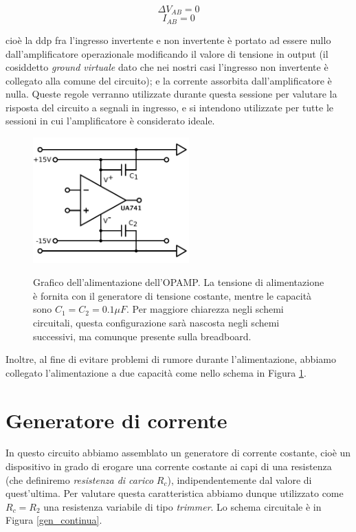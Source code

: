 \begin{equation}
\Delta V_{AB}=0
\label{eq:regola_V}
\end{equation}
\begin{equation}
I_{AB}=0
\label{eq:regola_I}
\end{equation}

cioè la ddp fra l'ingresso invertente e non invertente è portato ad essere nullo dall'amplificatore operazionale modificando il valore di tensione in output (il cosiddetto \textit{ground virtuale} dato che nei nostri casi l'ingresso non invertente è collegato alla comune del circuito); e la corrente assorbita dall'amplificatore è nulla.
Queste regole verranno utilizzate durante questa sessione per valutare la risposta del circuito a segnali in ingresso, e si intendono utilizzate per tutte le sessioni in cui l'amplificatore è considerato ideale.

\begin{figure}[ht]
 \centering
   {\includegraphics[width=6cm]{../E01/latex/alimentazione.pdf}}
 \caption{Grafico dell'alimentazione dell'OPAMP. La tensione di alimentazione è fornita con il generatore di tensione costante, mentre le capacità sono $C_1=C_2=0.1 \mu F$. Per maggiore chiarezza negli schemi circuitali, questa configurazione sarà nascosta negli schemi successivi, ma comunque presente sulla breadboard.}
 \label{gr:costante}
\end{figure}

Inoltre, al fine di evitare problemi di rumore durante l'alimentazione, abbiamo collegato l'alimentazione a due capacità come nello schema in Figura \ref{gr:costante}.

\section{Generatore di corrente}

In questo circuito abbiamo assemblato un generatore di corrente costante, cioè un dispositivo in grado di erogare una corrente costante ai capi di una resistenza (che definiremo \textit{resistenza di carico} $R_c$), indipendentemente dal valore di quest'ultima. Per valutare questa caratteristica abbiamo dunque utilizzato come $R_c=R_2$ una resistenza variabile di tipo \textit{trimmer}. Lo schema circuitale è in Figura \ref{gen_continua}.

